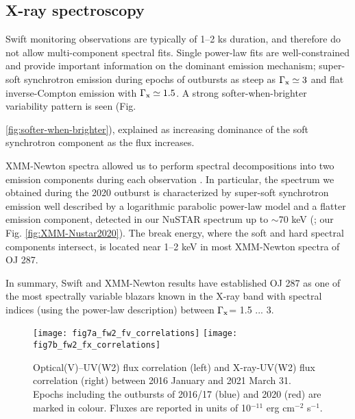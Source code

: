 \documentclass[preprints,article,accept,moreauthors,pdftex]{Definitions/mdpi}
\begin{document}
\subsection{X-ray spectroscopy}

Swift monitoring observations are typically of 1--2 ks duration, and therefore do not allow multi-component spectral fits. Single power-law fits are well-constrained and provide important information on the dominant emission mechanism; super-soft synchrotron emission during epochs of outbursts as steep as $\Gamma_{\rm x} \simeq 3$ and flat inverse-Compton emission  with  $\Gamma_{\rm x} \simeq 1.5$. A strong softer-when-brighter variability pattern is seen (Fig. {\ref{fig:softer-when-brighter}), explained as increasing dominance of the soft synchrotron component as the flux increases. 

XMM-Newton spectra allowed us to perform spectral decompositions into two emission components during each observation \citep{Komossa2021a}. In particular, the spectrum we obtained during the 2020 outburst is characterized by super-soft synchrotron emission well described by a logarithmic parabolic power-law model and a flatter emission component, detected in our NuSTAR spectrum up to $\sim$70 keV (\citep{Komossa2020}; our Fig. \ref{fig:XMM-Nustar2020}). 
The break energy, where the soft and hard spectral components intersect, is located near 1--2 keV in most XMM-Newton spectra of OJ 287.

In summary, Swift and XMM-Newton results have established OJ 287 as one of the most spectrally variable blazars known in the X-ray band with spectral indices (using the power-law description) between $\Gamma_{\rm x}$= 1.5 ... 3.   


\begin{figure}
\begin{center}
\texttt{[image: fig7a\_fw2\_fv\_correlations]}
\texttt{[image: fig7b\_fw2\_fx\_correlations]}
	\caption{Optical(V)--UV(W2) flux correlation (left) and X-ray-UV(W2) flux correlation (right) between 2016 January and 2021 March 31. Epochs including the outbursts of 2016/17 (blue) and 2020 (red) are marked in colour. Fluxes are reported in units of 10$^{-11}$ erg cm$^{-2}$ s$^{-1}$.
     }
     \label{fig:UV-X-corr}     
\end{center}
\end{figure}

}
\end{document}
